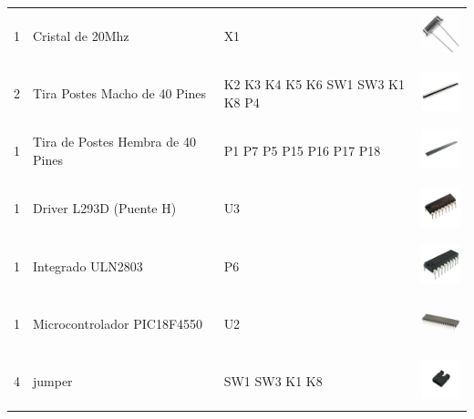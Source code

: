 \documentclass[letterpaper,10pt,english]{sphinxmanual}
\begin{document}
\begin{tabulary}{\linewidth}{|L|L|L|L|}
1
 & 
Cristal de 20Mhz
 & 
X1
 & 
\includegraphics[width=40pt,height=40pt]{cristal-20mhz.jpg}
\\

2
 & 
Tira Postes Macho de 40 Pines
 & 
K2 K3 K4 K5 K6 SW1 SW3 K1 K8 P4
 & 
\includegraphics[width=40pt,height=40pt]{pinesmacho.jpg}
\\

1
 & 
Tira de Postes Hembra de 40 Pines
 & 
P1 P7 P5 P15 P16 P17 P18
 & 
\includegraphics[width=40pt,height=40pt]{pineshembra.jpg}
\\

1
 & 
Driver L293D (Puente H)
 & 
U3
 & 
\includegraphics[width=40pt,height=40pt]{L293D.jpg}
\\

1
 & 
Integrado ULN2803
 & 
P6
 & 
\includegraphics[width=40pt,height=40pt]{uln2803.jpg}
\\

1
 & 
Microcontrolador PIC18F4550
 & 
U2
 & 
\includegraphics[width=40pt,height=40pt]{pic18f4550.jpg}
\\

4
 & 
jumper
 & 
SW1 SW3 K1 K8
 & 
\includegraphics[width=40pt,height=40pt]{Jumper.jpg}
\\
\hline\end{tabulary}
\end{document}
